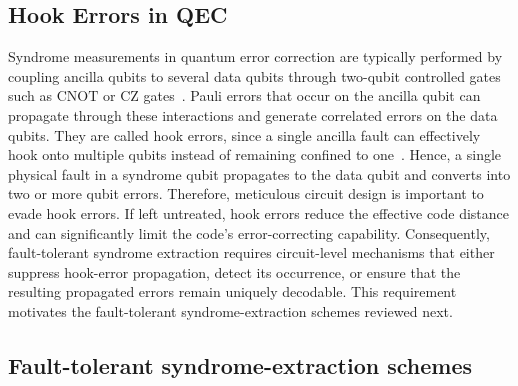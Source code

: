 \documentclass[reprint, amsmath,amssymb, aps,pra,
 floatfix,
]{revtex4-2}
\begin{document}
\subsection{Hook Errors in QEC}
\noindent Syndrome measurements in quantum error correction are typically performed by coupling ancilla qubits to several data qubits through two-qubit controlled gates such as $\mathrm{CNOT}$ or $\mathrm{CZ}$ gates~\cite{nielsen2010quantum}.
Pauli errors that occur on the ancilla qubit can propagate through these interactions and generate correlated errors on the data qubits.
They are called hook errors, since a single ancilla fault can effectively hook onto multiple qubits instead of remaining confined to one~\cite{10.1063/1.1499754}. Hence, a single physical fault in a syndrome qubit propagates to the data qubit and converts into two or more qubit errors. Therefore, meticulous circuit design is important to evade hook errors.
If left untreated, hook errors reduce the effective code distance and can significantly limit the code's error-correcting capability.
Consequently, fault-tolerant syndrome extraction requires circuit-level mechanisms that either suppress hook-error propagation, detect its occurrence, or ensure that the resulting propagated errors remain uniquely decodable.
This requirement motivates the fault-tolerant syndrome-extraction schemes reviewed next.

\subsection{Fault-tolerant syndrome-extraction schemes}
\end{document}
